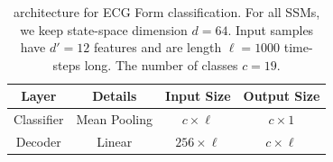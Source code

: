 \begin{table}[]
\centering
\caption{\ourmethod{} architecture for ECG Form classification. For all SSMs, we keep state-space dimension $d = 64$. Input samples have $d' = 12$ features and are length $\ell = 1000$ time-steps long. The number of classes $c = 19$.}
\label{tab:spacetime_ecg_form}
\begin{tabular}{@{}c|c|c|c@{}}
Layer       & Details                                                                                                                                                                                                                                                                                                                                                                                                                                                                                                                                      & Input Size        & Output Size       \\ \midrule
Classifier  & Mean Pooling                                                                                                                                                                                                                                                                                                                                                                                                                                                                                                                                 & $c \times \ell$   & $c \times 1$      \\ \midrule
Decoder     & Linear                                                                                                                                                                                                                                                                                                                                                                                                                                                                                                                                       & $256 \times \ell$ & $c \times \ell$   \\ \midrule

\end{tabular}
\end{table}
